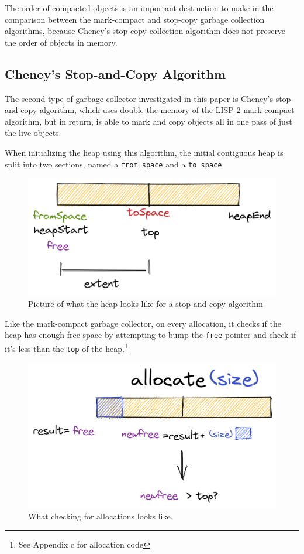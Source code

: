 \documentclass[index]{subfiles}
\begin{document}
The order of compacted objects is an important destinction to make in the comparison between the mark-compact and stop-copy garbage collection algorithms, because Cheney's stop-copy collection algorithm does not preserve the order of objects in memory.

\subsection{Cheney's Stop-and-Copy Algorithm}

The second type of garbage collector investigated in this paper is Cheney's stop-and-copy algorithm, which uses double the memory of the LISP 2 mark-compact algorithm, but in return, is able to mark and copy objects all in one pass of just the live objects.

When initializing the heap using this algorithm, the initial contiguous heap is split into two sections, named a \verb+from_space+ and a \verb+to_space+\cite[Chapter~2]{gc_handbook}.

\begin{figure}[H]
    \centering
    \includegraphics[scale=0.3]{pics/split-heap-diagram.png}
    \caption{Picture of what the heap looks like for a stop-and-copy algorithm}
\end{figure}

Like the mark-compact garbage collector, on every allocation, it checks if the heap has enough free space by attempting to bump the \verb+free+ pointer and check if it's less than the \verb+top+ of the heap.\footnote{See Appendix c for allocation code}

\begin{figure}[H]
    \centering
    \includegraphics[scale=0.3]{pics/allocation.png}
    \caption{What checking for allocations looks like.}
\end{figure}
\end{document}
